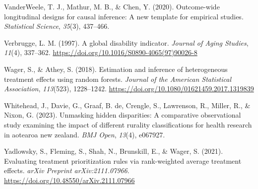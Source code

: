 \documentclass[
  single column]{article}
\newlength{\cslhangindent}
\newenvironment{CSLReferences}[2] %
 {\begin{list}{}{%
  \setlength{\itemindent}{0pt}
  \setlength{\leftmargin}{0pt}
  \setlength{\parsep}{0pt}
  \ifodd #1
   \setlength{\leftmargin}{\cslhangindent}
   \setlength{\itemindent}{-1\cslhangindent}
  \fi
  \setlength{\itemsep}{#2\baselineskip}}}
 {\end{list}}
\begin{document}
\begin{CSLReferences}{1}{0}
VanderWeele, T. J., Mathur, M. B., \& Chen, Y. (2020). Outcome-wide
longitudinal designs for causal inference: A new template for empirical
studies. \emph{Statistical Science}, \emph{35}(3), 437--466.

Verbrugge, L. M. (1997). A global disability indicator. \emph{Journal of
Aging Studies}, \emph{11}(4), 337--362.
\url{https://doi.org/10.1016/S0890-4065(97)90026-8}

Wager, S., \& Athey, S. (2018). Estimation and inference of
heterogeneous treatment effects using random forests. \emph{Journal of
the American Statistical Association}, \emph{113}(523), 1228--1242.
\url{https://doi.org/10.1080/01621459.2017.1319839}

Whitehead, J., Davie, G., Graaf, B. de, Crengle, S., Lawrenson, R.,
Miller, R., \& Nixon, G. (2023). Unmasking hidden disparities: A
comparative observational study examining the impact of different
rurality classifications for health research in aotearoa new zealand.
\emph{BMJ Open}, \emph{13}(4), e067927.

Yadlowsky, S., Fleming, S., Shah, N., Brunskill, E., \& Wager, S.
(2021). Evaluating treatment prioritization rules via rank-weighted
average treatment effects. \emph{arXiv Preprint arXiv:2111.07966}.
\url{https://doi.org/10.48550/arXiv.2111.07966}

\end{CSLReferences}
\end{document}
